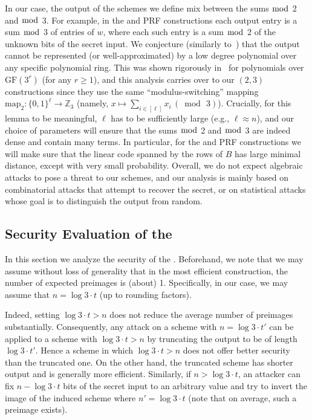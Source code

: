 In our case, the output of the schemes we define
mix between the sums $\bmod$ 2 and $\bmod$ 3.
For example, in the \ttOWF and PRF constructions each output entry is a sum $\bmod$ 3 of entries of $w$,
where each such entry is a sum $\bmod$ 2 of the unknown bits of the secret input.
We conjecture (similarly to~\cite{boneh2018-darkmatter}) that
the output cannot be represented (or well-approximated) by a low degree polynomial over any specific polynomial ring. This was shown rigorously in~\cite[Lemma 4.2]{boneh2018-darkmatter} for polynomials over $\mathrm{GF}(3^r)$ (for any $r \geq 1$), and this analysis carries
over to our $(2,3)$ constructions since they use the same ``modulus-switching'' mapping $\mathrm{map}_2:\{0,1\}^\ell \rightarrow \mathbb{Z}_3$ (namely,
$x \mapsto \sum_{i \in [\ell]}x_i \, (\bmod \, 3)$).
Crucially, for this lemma to be meaningful, 
$\ell$ has to be sufficiently large (e.g., $\ell \approx n$),
and our choice of parameters will ensure that the sums $\bmod$ 2 and $\bmod$ 3
are indeed dense and contain many terms.
In particular, for the
\ttOWF and PRF constructions
we will make sure that the linear code spanned by the rows of $B$ has large minimal distance,
except with very small probability.
Overall, we do not expect algebraic attacks to pose a threat to our schemes,
and our analysis is mainly based on combinatorial attacks that attempt to recover the secret,
or on statistical attacks whose goal is to distinguish the output from random.


\subsection{Security Evaluation of the \ttOWF}

In this section we analyze the security of the \ttOWF.
Beforehand, we note that we may assume without loss of generality that in the most efficient construction, the number of expected preimages is (about) 1. Specifically, in our case, we may assume that $n = \log 3 \cdot t$ (up to rounding factors).

Indeed, setting $\log 3 \cdot t > n$ does not reduce the average number of preimages substantially. Consequently, any attack on a scheme with $n = \log 3 \cdot t'$ can be applied to a scheme with $\log 3 \cdot t > n$ by truncating the output to be of length $\log 3 \cdot t'$. Hence a scheme in which $\log 3 \cdot t > n$ does not offer better security than the truncated one.
On the other hand, the truncated scheme has shorter output and is generally more efficient.
Similarly, if $n > \log 3 \cdot t$, an attacker can fix $n - \log 3 \cdot t$ bits of the secret input to an arbitrary value and try to invert the image of the induced scheme where $n' = \log 3 \cdot t$ (note that on average, such a preimage exists).


